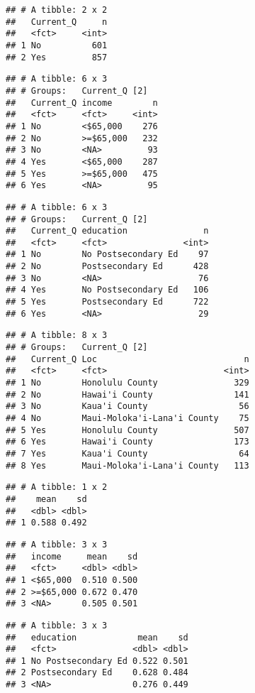\documentclass[]{article}
\begin{document}
\begin{verbatim}
## # A tibble: 2 x 2
##   Current_Q     n
##   <fct>     <int>
## 1 No          601
## 2 Yes         857
\end{verbatim}

\begin{verbatim}
## # A tibble: 6 x 3
## # Groups:   Current_Q [2]
##   Current_Q income        n
##   <fct>     <fct>     <int>
## 1 No        <$65,000    276
## 2 No        >=$65,000   232
## 3 No        <NA>         93
## 4 Yes       <$65,000    287
## 5 Yes       >=$65,000   475
## 6 Yes       <NA>         95
\end{verbatim}

\begin{verbatim}
## # A tibble: 6 x 3
## # Groups:   Current_Q [2]
##   Current_Q education               n
##   <fct>     <fct>               <int>
## 1 No        No Postsecondary Ed    97
## 2 No        Postsecondary Ed      428
## 3 No        <NA>                   76
## 4 Yes       No Postsecondary Ed   106
## 5 Yes       Postsecondary Ed      722
## 6 Yes       <NA>                   29
\end{verbatim}

\begin{verbatim}
## # A tibble: 8 x 3
## # Groups:   Current_Q [2]
##   Current_Q Loc                             n
##   <fct>     <fct>                       <int>
## 1 No        Honolulu County               329
## 2 No        Hawai'i County                141
## 3 No        Kaua'i County                  56
## 4 No        Maui-Moloka'i-Lana'i County    75
## 5 Yes       Honolulu County               507
## 6 Yes       Hawai'i County                173
## 7 Yes       Kaua'i County                  64
## 8 Yes       Maui-Moloka'i-Lana'i County   113
\end{verbatim}

\begin{verbatim}
## # A tibble: 1 x 2
##    mean    sd
##   <dbl> <dbl>
## 1 0.588 0.492
\end{verbatim}

\begin{verbatim}
## # A tibble: 3 x 3
##   income     mean    sd
##   <fct>     <dbl> <dbl>
## 1 <$65,000  0.510 0.500
## 2 >=$65,000 0.672 0.470
## 3 <NA>      0.505 0.501
\end{verbatim}

\begin{verbatim}
## # A tibble: 3 x 3
##   education            mean    sd
##   <fct>               <dbl> <dbl>
## 1 No Postsecondary Ed 0.522 0.501
## 2 Postsecondary Ed    0.628 0.484
## 3 <NA>                0.276 0.449
\end{verbatim}
\end{document}
